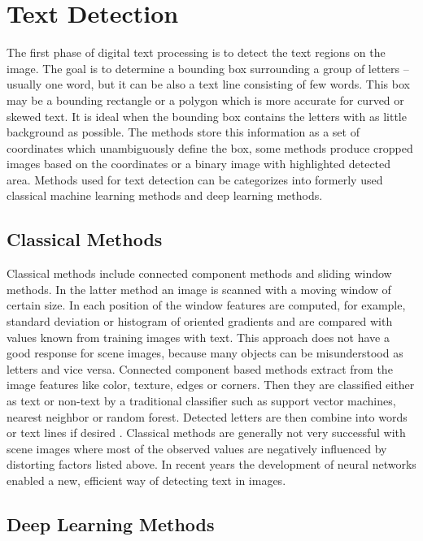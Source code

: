 \section{Text Detection}

The first phase of digital text processing is to detect the text regions on the image. The goal is to determine a bounding box surrounding a group of letters -- usually one word, but it can be also a text line consisting of few words. This box may be a bounding rectangle or a polygon which is more accurate for curved or skewed text. It is ideal when the bounding box contains the letters with as little background as possible. The methods store this information as a set of coordinates which unambiguously define the box, some methods produce cropped images based on the coordinates or a binary image with highlighted detected area.%
Methods used for text detection can be categorizes into formerly used classical machine learning methods and deep learning methods. 

\subsection*{Classical Methods}

Classical methods include connected component methods and sliding window methods. In the latter method an image is scanned with a moving window of certain size. In each position of the window features are computed, for example, standard deviation or histogram of oriented gradients and are compared with values known from training images with text.    This approach does not have a good response for scene images, because many objects can be misunderstood as letters and vice versa. Connected component based methods extract from the image features like color, texture, edges or corners. Then they are classified either as text or non-text by a traditional classifier such as support vector machines, nearest neighbor or random forest. Detected letters are then combine into words or text lines if desired \cite{raisi2020text}. Classical methods are generally not very successful with scene images where most of the observed values are negatively influenced by distorting factors listed above. In recent years the development of neural networks enabled a new, efficient way of detecting text in images.

\subsection*{Deep Learning Methods}


